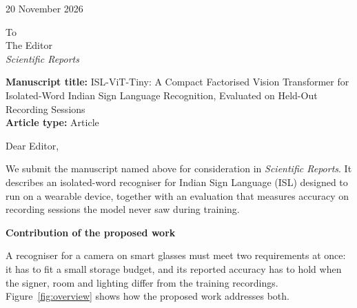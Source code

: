 \documentclass[11pt,a4paper]{article}
\begin{document}
\begin{flushright}
20 November 2026
\end{flushright}

To\\
The Editor\\
\textit{Scientific Reports}

\textbf{Manuscript title:} ISL-ViT-Tiny: A Compact Factorised Vision Transformer for Isolated-Word Indian Sign Language Recognition, Evaluated on Held-Out Recording Sessions\\
\textbf{Article type:} Article

Dear Editor,

We submit the manuscript named above for consideration in \textit{Scientific Reports}. It describes an isolated-word recogniser for Indian Sign Language (ISL) designed to run on a wearable device, together with an evaluation that measures accuracy on recording sessions the model never saw during training.

\textbf{Contribution of the proposed work}

A recogniser for a camera on smart glasses must meet two requirements at once: it has to fit a small storage budget, and its reported accuracy has to hold when the signer, room and lighting differ from the training recordings. Figure~\ref{fig:overview} shows how the proposed work addresses both.
\end{document}
